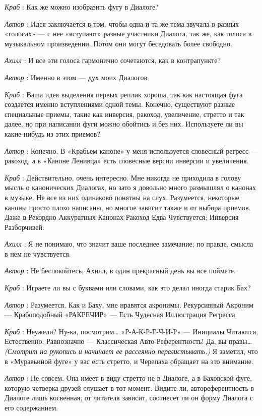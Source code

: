 \documentclass[../main.tex]{subfiles}
\begin{document}
\begin{dialogue}
\emph{Краб} : Как же можно изобразить фугу в Диалоге?

\emph{Автор} : Идея заключается в том, чтобы одна и та же тема звучала в разных «голосах» --- с нее «вступают» разные участники Диалога, так же, как голоса в музыкальном произведении. Потом они могут беседовать более свободно.

\emph{Ахилл} : И все эти голоса гармонично сочетаются, как в контрапункте?

\emph{Автор} : Именно в этом --- дух моих Диалогов.

\emph{Краб} : Ваша идея выделения первых реплик хороша, так как настоящая фуга создается именно вступлениями одной темы. Конечно, существуют разные специальные приемы, такие как инверсия, ракоход, увеличение, стретто и так далее, но при написании фуги можно обойтись и без них. Используете ли вы какие-нибудь из этих приемов?

\emph{Автор} : Конечно. В «Крабьем каноне» у меня используется словесный регресс --- ракоход, а в «Каноне Ленивца» есть словесные версии инверсии и увеличения.

\emph{Краб} : Действительно, очень интересно. Мне никогда не приходила в голову мысль о канонических Диалогах, но зато я довольно много размышлял о канонах в музыке. Не все из них одинаково понятны на слух. Разумеется, некоторые каноны просто плохо написаны, но многое зависит также и от выбора приемов. Даже в Рекордно Аккуратных Канонах Ракоход Едва Чувствуется; Инверсия Разборчивей.

\emph{Ахилл} : Я не понимаю, что значит ваше последнее замечание; по правде, смысла в нем не чувствуется.

\emph{Автор} : Не беспокойтесь, Ахилл, в один прекрасный день вы все поймете.

\emph{Краб} : Играете ли вы с буквами или словами, как это делал иногда старик Бах?

\emph{Автор} : Разумеется. Как и Баху, мне нравятся акронимы. Рекурсивный Акроним --- Крабоподобный «РАКРЕЧИР» --- Есть Чудесная Иллюстрация Регресса.

\emph{Краб} : Неужели? Ну-ка, посмотрим\ldots{} «Р-А-К-Р-Е-Ч-И-Р» --- Инициалы Читаются, Естественно, Равнозначно --- Классическая Авто-Референтность! Да, вы правы\ldots{} \emph{(Смотрит на рукопись и начинает ее рассеянно перелистывать.)} Я заметил, что в «Муравьиной фуге» у вас есть стретто, и Черепаха обращает на это внимание.

\emph{Автор} : Не совсем. Она имеет в виду стретто не в Диалоге, а в Баховской фуге, которую четверка друзей слушает в тот момент. Видите ли, автореферентность в Диалоге лишь косвенная; от читателя зависит, соотнесет ли он форму Диалога с его содержанием.


\end{dialogue}
\end{document}

